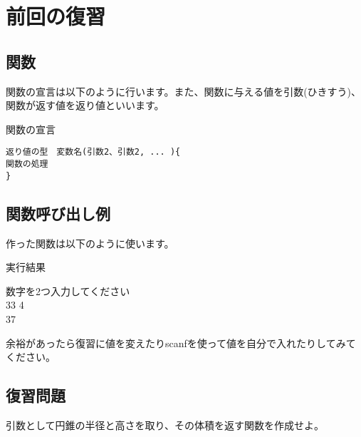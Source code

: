 ﻿\section{前回の復習}
\subsection{関数}
関数の宣言は以下のように行います。また、関数に与える値を引数(ひきすう)、関数が返す値を返り値といいます。

\begin{itembox}{関数の宣言}
\begin{verbatim}
返り値の型　変数名(引数2、引数2, ... ){
関数の処理
}
\end{verbatim}
\end{itembox}

\subsection{関数呼び出し例}
作った関数は以下のように使います。

\begin{itembox}{実行結果}

数字を2つ入力してください\\
33 4\\
37
\end{itembox}
余裕があったら復習に値を変えたりscanfを使って値を自分で入れたりしてみてください。
\subsection{復習問題}
引数として円錐の半径と高さを取り、その体積を返す関数を作成せよ。
